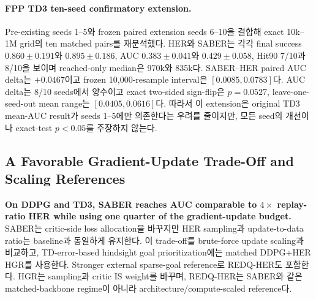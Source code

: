 \documentclass[letterpaper]{article}
\begin{document}
\paragraph{FPP TD3 ten-seed confirmatory extension.}
Pre-existing seeds 1--5와 frozen paired extension seeds 6--10을 결합해 exact 10k--1M grid의 ten matched pairs를 재분석했다. HER와 SABER는 각각 final success $0.860\pm0.191$와 $0.895\pm0.186$, AUC $0.383\pm0.041$와 $0.429\pm0.058$, Hit90 7/10과 8/10을 보이며 reached-only median은 970k와 835k다. SABER--HER paired AUC delta는 $+0.0467$이고 frozen 10,000-resample interval은 $[0.0085,0.0783]$다. AUC delta는 8/10 seeds에서 양수이고 exact two-sided sign-flip은 $p=0.0527$, leave-one-seed-out mean range는 $[0.0405,0.0616]$다. 따라서 이 extension은 original TD3 mean-AUC result가 seeds 1--5에만 의존한다는 우려를 줄이지만, 모든 seed의 개선이나 exact-test $p<0.05$를 주장하지 않는다.

\subsection{A Favorable Gradient-Update Trade-Off and Scaling References}

\textbf{On DDPG and TD3, SABER reaches AUC comparable to $4\times$ replay-ratio HER while using one quarter of the gradient-update budget.}
SABER는 critic-side loss allocation을 바꾸지만 HER sampling과 update-to-data ratio는 baseline과 동일하게 유지한다. 이 trade-off를 brute-force update scaling과 비교하고, TD-error-based hindsight goal prioritization에는 matched DDPG+HER HGR를 사용한다. Stronger external sparse-goal reference로 REDQ-HER도 포함한다. HGR는 sampling과 critic IS weight를 바꾸며, REDQ-HER는 SABER와 같은 matched-backbone regime이 아니라 architecture/compute-scaled reference다.
\end{document}
